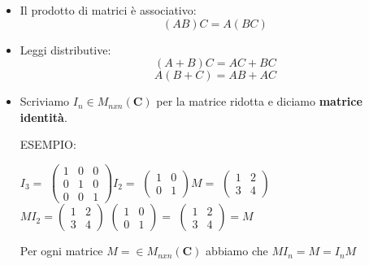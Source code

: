 \documentclass[12pt]{article}
\begin{document}
\begin{itemize}
    \item Il prodotto di matrici è associativo: \[(AB)C = A(BC)\]
    \item Leggi distributive: \[(A+B)C = AC + BC\]
    \[A(B+C) = AB + AC\]
    \item Scriviamo $I_n \in M_{nxn} (\mathbf{C})$ per la matrice ridotta e diciamo \textbf{matrice identità}.

ESEMPIO:

\begin{center}
$I_3 =$
$\begin{pmatrix}
  1 & 0 & 0\\
  0 & 1 & 0\\
  0 & 0 & 1
\end{pmatrix} I_2 = $
$\begin{pmatrix}
  1 & 0\\
  0 & 1
\end{pmatrix} M = $
$\begin{pmatrix}
  1 & 2\\
  3 & 4
\end{pmatrix}$\\
$MI_2 = \begin{pmatrix}
  1 & 2\\
  3 & 4
\end{pmatrix}$
$\begin{pmatrix}
  1 & 0\\
  0 & 1
\end{pmatrix} = $
$\begin{pmatrix}
    1 & 2\\
    3 & 4
\end{pmatrix} = M$
\end{center}
Per ogni matrice $M = \in M_{nxn} (\mathbf{C})$ abbiamo che $MI_n = M = I_nM$


\end{itemize}
\end{document}
